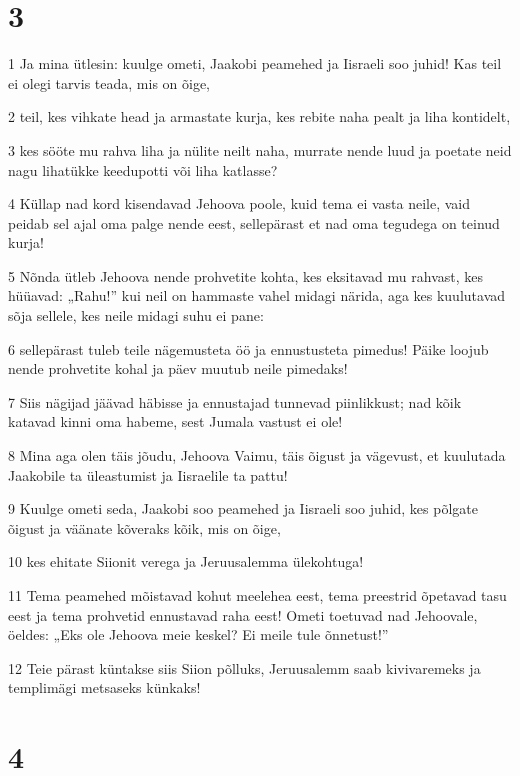 \chapter{3}

\par 1 Ja mina ütlesin: kuulge ometi, Jaakobi peamehed ja Iisraeli soo juhid! Kas teil ei olegi tarvis teada, mis on õige,
\par 2 teil, kes vihkate head ja armastate kurja, kes rebite naha pealt ja liha kontidelt,
\par 3 kes sööte mu rahva liha ja nülite neilt naha, murrate nende luud ja poetate neid nagu lihatükke keedupotti või liha katlasse?
\par 4 Küllap nad kord kisendavad Jehoova poole, kuid tema ei vasta neile, vaid peidab sel ajal oma palge nende eest, sellepärast et nad oma tegudega on teinud kurja!
\par 5 Nõnda ütleb Jehoova nende prohvetite kohta, kes eksitavad mu rahvast, kes hüüavad: „Rahu!” kui neil on hammaste vahel midagi närida, aga kes kuulutavad sõja sellele, kes neile midagi suhu ei pane:
\par 6 sellepärast tuleb teile nägemusteta öö ja ennustusteta pimedus! Päike loojub nende prohvetite kohal ja päev muutub neile pimedaks!
\par 7 Siis nägijad jäävad häbisse ja ennustajad tunnevad piinlikkust; nad kõik katavad kinni oma habeme, sest Jumala vastust ei ole!
\par 8 Mina aga olen täis jõudu, Jehoova Vaimu, täis õigust ja vägevust, et kuulutada Jaakobile ta üleastumist ja Iisraelile ta pattu!
\par 9 Kuulge ometi seda, Jaakobi soo peamehed ja Iisraeli soo juhid, kes põlgate õigust ja väänate kõveraks kõik, mis on õige,
\par 10 kes ehitate Siionit verega ja Jeruusalemma ülekohtuga!
\par 11 Tema peamehed mõistavad kohut meelehea eest, tema preestrid õpetavad tasu eest ja tema prohvetid ennustavad raha eest! Ometi toetuvad nad Jehoovale, öeldes: „Eks ole Jehoova meie keskel? Ei meile tule õnnetust!”
\par 12 Teie pärast küntakse siis Siion põlluks, Jeruusalemm saab kivivaremeks ja templimägi metsaseks künkaks!

\chapter{4}

